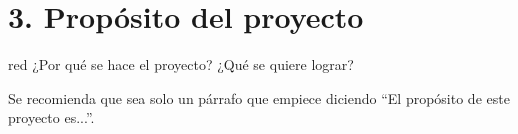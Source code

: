 \section{3. Propósito del proyecto}
\label{sec:proposito}

\begin{consigna}{red}
¿Por qué se hace el proyecto? ¿Qué se quiere lograr?

Se recomienda que sea solo un párrafo que empiece diciendo ``El propósito de este proyecto es...''.
\end{consigna}
